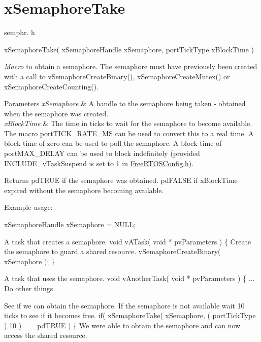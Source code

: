 \hypertarget{group__x_semaphore_take}{\section{x\-Semaphore\-Take}
\label{group__x_semaphore_take}
}
semphr. h 
\begin{DoxyPre}xSemaphoreTake( 
                     xSemaphoreHandle xSemaphore, 
                     portTickType xBlockTime 
                 )\end{DoxyPre}


{\itshape Macro} to obtain a semaphore. The semaphore must have previously been created with a call to v\-Semaphore\-Create\-Binary(), x\-Semaphore\-Create\-Mutex() or x\-Semaphore\-Create\-Counting().


\begin{DoxyParams}{Parameters}
{\em x\-Semaphore} & A handle to the semaphore being taken -\/ obtained when the semaphore was created.\\
\hline
{\em x\-Block\-Time} & The time in ticks to wait for the semaphore to become available. The macro port\-T\-I\-C\-K\-\_\-\-R\-A\-T\-E\-\_\-\-M\-S can be used to convert this to a real time. A block time of zero can be used to poll the semaphore. A block time of port\-M\-A\-X\-\_\-\-D\-E\-L\-A\-Y can be used to block indefinitely (provided I\-N\-C\-L\-U\-D\-E\-\_\-v\-Task\-Suspend is set to 1 in \hyperlink{_free_r_t_o_s_config_8h_source}{Free\-R\-T\-O\-S\-Config.\-h}).\\
\hline
\end{DoxyParams}
\begin{DoxyReturn}{Returns}
pd\-T\-R\-U\-E if the semaphore was obtained. pd\-F\-A\-L\-S\-E if x\-Block\-Time expired without the semaphore becoming available.
\end{DoxyReturn}
Example usage\-: 
\begin{DoxyPre}
 xSemaphoreHandle xSemaphore = NULL;\end{DoxyPre}



\begin{DoxyPre}A task that creates a semaphore.
 void vATask( void * pvParameters )
 \{
Create the semaphore to guard a shared resource.
    vSemaphoreCreateBinary( xSemaphore );
 \}\end{DoxyPre}



\begin{DoxyPre}A task that uses the semaphore.
 void vAnotherTask( void * pvParameters )
 \{
... Do other things.
\begin{DoxyVerb}if( xSemaphore != NULL )
{
\end{DoxyVerb}

See if we can obtain the semaphore.  If the semaphore is not available
wait 10 ticks to see if it becomes free.        
        if( xSemaphoreTake( xSemaphore, ( portTickType ) 10 ) == pdTRUE )
        \{
We were able to obtain the semaphore and can now access the
shared resource.\end{DoxyPre}




